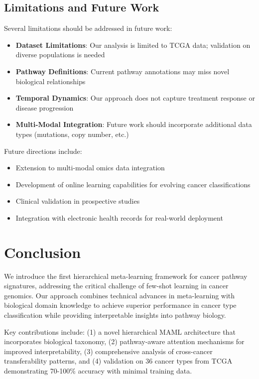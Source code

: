 \documentclass{article}
\begin{document}
\subsection{Limitations and Future Work}

Several limitations should be addressed in future work:

\begin{itemize}
\item \textbf{Dataset Limitations}: Our analysis is limited to TCGA data; validation on diverse populations is needed
\item \textbf{Pathway Definitions}: Current pathway annotations may miss novel biological relationships
\item \textbf{Temporal Dynamics}: Our approach does not capture treatment response or disease progression
\item \textbf{Multi-Modal Integration}: Future work should incorporate additional data types (mutations, copy number, etc.)
\end{itemize}

Future directions include:
\begin{itemize}
\item Extension to multi-modal omics data integration
\item Development of online learning capabilities for evolving cancer classifications
\item Clinical validation in prospective studies
\item Integration with electronic health records for real-world deployment
\end{itemize}

\section{Conclusion}

We introduce the first hierarchical meta-learning framework for cancer pathway signatures, addressing the critical challenge of few-shot learning in cancer genomics. Our approach combines technical advances in meta-learning with biological domain knowledge to achieve superior performance in cancer type classification while providing interpretable insights into pathway biology.

Key contributions include: (1) a novel hierarchical MAML architecture that incorporates biological taxonomy, (2) pathway-aware attention mechanisms for improved interpretability, (3) comprehensive analysis of cross-cancer transferability patterns, and (4) validation on 36 cancer types from TCGA demonstrating 70-100\% accuracy with minimal training data.
\end{document}
